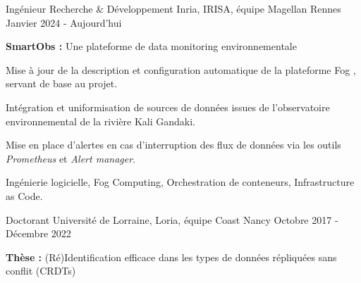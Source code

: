 
\begin{cventries}

\cventry
    {Ingénieur Recherche \& Développement}
    {Inria, IRISA, équipe Magellan}
    {Rennes}
    {Janvier 2024 - Aujourd'hui}
    {}

\vspace{-1.5em}
\begin{cvparagraph}
    \textbf{SmartObs :} Une plateforme de data monitoring environnementale

    \medskip
    \begin{cvitems} %
        \item Mise à jour de la description et configuration automatique de la plateforme Fog , servant de base au projet.
        \item Intégration et uniformisation de sources de données issues de l'observatoire environnemental de la rivière Kali Gandaki.
        \item Mise en place d'alertes en cas d'interruption des flux de données via les outils \emph{Prometheus} et \emph{Alert manager}.
    \end{cvitems}

    \medskip
     Ingénierie logicielle, Fog Computing, Orchestration de conteneurs, Infrastructure as Code.
\end{cvparagraph}

\vspace{1em}
\cventry
    {Doctorant}
    {Université de Lorraine, Loria, équipe Coast}
    {Nancy}
    {Octobre 2017 - Décembre 2022}
    {}

\vspace{-1.5em}
\begin{cvparagraph}
    \textbf{Thèse :} (Ré)Identification efficace dans les types de données répliquées sans conflit (CRDTs)


\end{cvparagraph}
\end{cventries}
